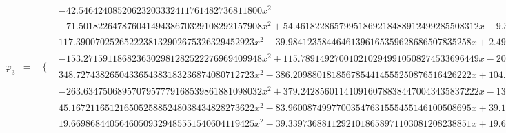 \documentclass{article}
\begin{document}
\begin{landscape}
\begin{eqnarray*}
\begin{array}{cc}
\end{array}\\
\varphi_3 & = & \begin{array}{cc}
 \{ & 
\begin{array}{cc}
 -42.54642408520623203332411761482736811800 x^2 & x\geq 0\land x<\frac{1}{8} \\
 -71.50182264787604149438670329108292157908 x^2+54.46182286579951869218488912499285508312 x-9.306735582253978209126460908553174282426 & x\geq \frac{1}{4}\land x<\frac{3}{8} \\
 117.3900702526522238132902675326329452923 x^2-39.98412358446461396165359628686507835258 x+2.499007724029038372603349767929067397036 & x\geq \frac{1}{8}\land x<\frac{1}{4} \\
 -153.2715911868236302981282522276969409948 x^2+115.7891492700102102949910508274533696449 x-20.80560928304348288465261622776452076277 & x\geq \frac{3}{8}\land x<\frac{1}{2} \\
 348.7274382650433654383183236874080712723 x^2-386.2098801818567854414555250876516426222 x+104.6941480799232660494590277510117323040 & x\geq \frac{1}{2}\land x<\frac{5}{8} \\
 -263.6347506895707957779168539861881098032 x^2+379.2428560114109160788384470043435837222 x-134.5098319804728906756328385277367759286 & x\geq \frac{5}{8}\land x<\frac{3}{4} \\
 45.16721165121650525885248038434828273622 x^2-83.96008749977003547631555455146100508695 x+39.19127183621996615754991205568994487482 & x\geq \frac{3}{4}\land x<\frac{7}{8} \\
 19.66986844056460509329485551540604119425 x^2-39.33973688112921018658971103081208238851 x+19.66986844056460509329485551540604119425 & x\geq \frac{7}{8}\land x<1
\end{array}


\end{array}
\end{eqnarray*}
\end{landscape}
\end{document}

